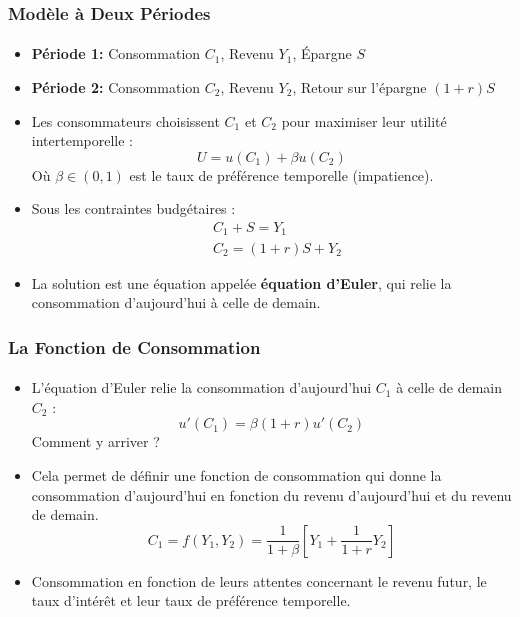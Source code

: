 \documentclass{beamer}
\begin{document}
\begin{frame}
    \frametitle{Modèle à Deux Périodes}
    \framesubtitle{}

    \begin{itemize}
        \item \textbf{Période 1:} Consommation \( C_1 \), Revenu \( Y_1 \), Épargne \( S \)
        \pause
        \item \textbf{Période 2:} Consommation \( C_2 \), Revenu \( Y_2 \), Retour sur l'épargne \( (1 + r)S \)
        \pause
        \item Les consommateurs choisissent \( C_1 \) et \( C_2 \) pour maximiser leur utilité intertemporelle :
        \[
        U = u(C_1) + \beta u(C_2)
        \]
        Où \( \beta \in (0,1) \) est le taux de préférence temporelle (impatience).
        \item Sous les contraintes budgétaires :
        \begin{align*}
            &C_1 + S = Y_1
            \\
            &C_2 = (1 + r)S + Y_2    
        \end{align*}
        \pause

        \item La solution est une équation appelée \textbf{équation d'Euler}, qui relie la consommation d'aujourd'hui à celle de demain.
    \end{itemize}
\end{frame}

\begin{frame}
    \frametitle{La Fonction de Consommation}
    \framesubtitle{}

    \begin{itemize}
        \item L'équation d'Euler relie la consommation d'aujourd'hui \( C_1 \) à celle de demain \( C_2 \) :
        \[
        u'(C_1) = \beta (1 + r) u'(C_2)
        \]
        Comment y arriver ?
        \pause
        \item Cela permet de définir une fonction de consommation qui donne la consommation d'aujourd'hui en 
        fonction du revenu d'aujourd'hui et du revenu de demain.
        \[
        C_1 = f(Y_1,Y_2) = \frac{1}{1 + \beta} \left[ Y_1 + \frac{1}{1 + r} Y_2 \right] 
        \]
        \item Consommation en fonction de leurs attentes concernant le revenu futur, le taux d'intérêt et leur 
        taux de préférence temporelle.
    \end{itemize}

\end{frame}
\end{document}
